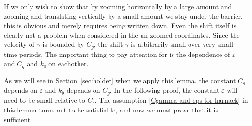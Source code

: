 \documentclass[11pt]{amsart}
\theoremstyle{remark}
\theoremstyle{definition}
\newcommand{\eps}{\varepsilon}
\newcommand{\Cgamma}{C_g}
\begin{document}
If we only wish to show that by zooming horizontally by a large amount and zooming and translating vertically by a small amount we stay under the barrier, this is obvious and merely requires being written down.  Even the shift itself is clearly not a problem when considered in the un-zoomed coordinates.  Since the velocity of $\gamma$ is bounded by $\Cgamma$, the shift $\gamma$ is arbitrarily small over very small time periods.  The important thing to pay attention for is the dependence of $\eps$ and $\Cgamma$ and $k_0$ on eachother.  

As we will see in Section~\ref{sec:holder} when we apply this lemma, the constant $\Cgamma$ depends on $\eps$ and $k_0$ depends on $\Cgamma$.  In the following proof, the constant $\eps$ will need to be small relative to $\Cgamma$.  The assumption \eqref{Cgamma and eps for harnack} in this lemma turns out to be satisfiable, and now we must prove that it is sufficient.  

\end{document}
